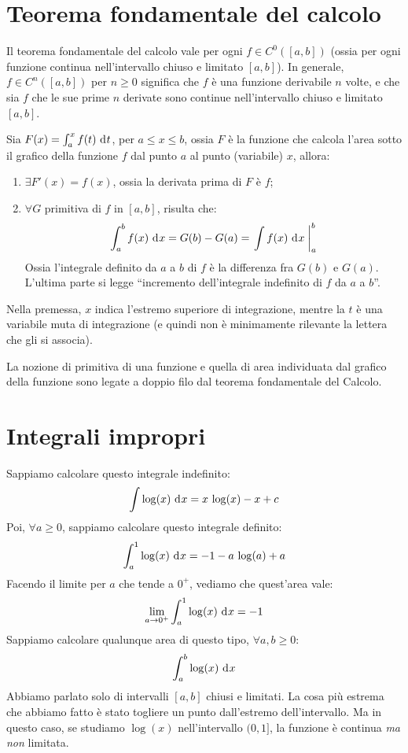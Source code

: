



\section{Teorema fondamentale del calcolo}

Il teorema fondamentale del calcolo vale per ogni $f \in C^{0} ([a,b])$ (ossia per ogni funzione continua nell'intervallo chiuso e limitato $[a,b]$).
In generale, $f \in C^{n} ([a,b])$ per $n \ge 0$ significa che $f$ \`e una funzione derivabile $n$ volte, e che sia $f$ che le sue prime $n$ derivate sono continue nell'intervallo chiuso e limitato $[a,b]$.

\begin{theorem}
Sia $F(x) = \int_{a}^{x} f(t) \dx[t]$, per $a \le x \le b$, ossia $F$ \`e la funzione che calcola l'area sotto il grafico della funzione $f$ dal punto $a$ al punto (variabile) $x$, allora:
\begin{enumerate}
    \item $\exists F'(x) = f(x)$, ossia la derivata prima di $F$ \`e $f$;
    \item $\forall G$ primitiva di $f$ in $[a,b]$, risulta che:
    \[
    \int_{a}^{b} f(x) \dx = G(b) - G(a) = \increment{\int f(x) \dx}_{a}^{b}
    \]
	Ossia l'integrale definito da $a$ a $b$ di $f$ \`e la differenza fra $G(b)$ e $G(a)$.
    L'ultima parte si legge ``incremento dell'integrale indefinito di $f$ da $a$ a $b$''.
\end{enumerate}
\end{theorem}
Nella premessa, $x$ indica l'estremo superiore di integrazione, mentre la $t$ \`e una variabile muta di integrazione (e quindi non \`e minimamente rilevante la lettera che gli si associa).

La nozione di primitiva di una funzione e quella di area individuata dal grafico della funzione sono legate a doppio filo dal teorema fondamentale del Calcolo.

\newpage
\section{Integrali impropri}

Sappiamo calcolare questo integrale indefinito:
\[
\int \log (x) \dx = x \, \log (x) - x + c
\]
Poi, $\forall a \ge 0$, sappiamo calcolare questo integrale definito:
\[
\int_{a}^{1} \log (x) \dx = - 1 - a \, \log (a) + a
\]
Facendo il limite per $a$ che tende a $0^+$, vediamo che quest'area vale:
\[
\lim_{a \to 0^+} \int_{a}^{1} \log (x) \dx = -1
\]
Sappiamo calcolare qualunque area di questo tipo, $\forall a, b \ge 0$:
\[
\int_{a}^{b} \log (x) \dx
\]
Abbiamo parlato solo di intervalli $[a,b]$ chiusi e limitati. La cosa pi\`u estrema che abbiamo fatto \`e stato togliere un punto dall'estremo dell'intervallo. Ma in questo caso, se studiamo $\log (x)$ nell'intervallo $(0,1]$, la funzione \`e continua \emph{ma non} limitata.

